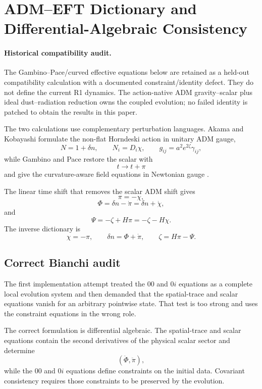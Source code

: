 \section{ADM--EFT Dictionary and Differential-Algebraic Consistency}

\paragraph{Historical compatibility audit.}
The Gambino--Pace/curved effective equations below are retained as a
held-out compatibility calculation with a documented constraint/identity
defect. They do not define the current R1 dynamics. The action-native
ADM gravity--scalar plus ideal dust--radiation reduction owns the coupled
evolution; no failed identity is patched to obtain the results in this paper.

The two calculations use complementary perturbation languages. Akama and Kobayashi formulate the non-flat Horndeski action in unitary ADM gauge,
\[
N=1+\delta n,\qquad
N_i=D_i\chi,\qquad
g_{ij}=a^2e^{2\zeta}\gamma_{ij},
\]
while Gambino and Pace restore the scalar with
\[
t\rightarrow t+\pi
\]
and give the curvature-aware field equations in Newtonian gauge \citep{AkamaKobayashi2019,GambinoPace2024}.

The linear time shift that removes the scalar ADM shift gives
\[
\boxed{\pi=-\chi},
\]
\[
\boxed{\Phi=\delta n-\dot\pi=\delta n+\dot\chi},
\]
and
\[
\boxed{\Psi=-\zeta+H\pi=-\zeta-H\chi}.
\]
The inverse dictionary is
\[
\boxed{
\chi=-\pi,\qquad
\delta n=\Phi+\dot\pi,\qquad
\zeta=H\pi-\Psi .
}
\]

\subsection{Correct Bianchi audit}

The first implementation attempt treated the \(00\) and \(0i\) equations as a complete local evolution system and then demanded that the spatial-trace and scalar equations vanish for an arbitrary pointwise state. That test is too strong and uses the constraint equations in the wrong role.

The correct formulation is differential algebraic. The spatial-trace and scalar equations contain the second derivatives of the physical scalar sector and determine
\[
(\ddot\Phi,\ddot\pi),
\]
while the \(00\) and \(0i\) equations define constraints on the initial data. Covariant consistency requires those constraints to be preserved by the evolution.

